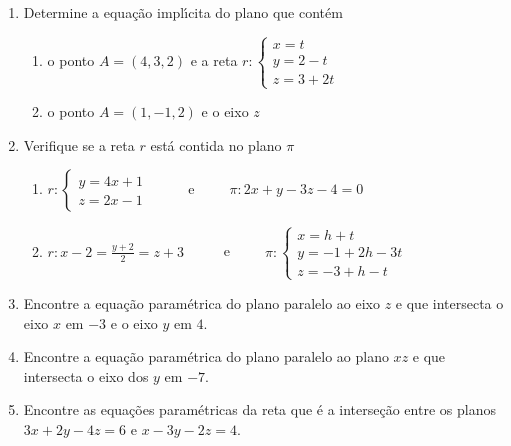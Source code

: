 \documentclass[a4paper,5pt]{amsbook}
\begin{document}
\begin{enumerate}
	\vspace{0.5cm}
	\item Determine a equa\c{c}\~ao impl\'{\i}cita do plano que cont\'em
	\begin{enumerate}
		\vspace{0.3cm}
		\item o ponto $A = (4, 3, 2)$ e a reta
			$r:\left\{\begin{array}{l}
				x = t \\
				y = 2 -t \\
				z = 3 + 2t
			\end{array}\right.$
		\vspace{0.3cm}
		\item o ponto $A = (1, -1, 2)$ e o eixo $z$
	\end{enumerate}
	
	\vspace{0.5cm}
	\item Verifique se a reta $r$ est\'a contida no plano $\pi$
	\begin{enumerate}
		\vspace{0.3cm}
		\item 
			$r:\left\{\begin{array}{l}
				y = 4x + 1 \\
				z = 2x - 1
			\end{array}\right.$
		\ \ \ \ \ e\ \ \ \ \ 
			$\pi:2x + y - 3z - 4 = 0$
		\vspace{0.3cm}
		\item
			$r: x-2 = \frac{y+2}{2} = z+3$
		\ \ \ \ \ e\ \ \ \ \ 
			$\pi:\left\{\begin{array}{l}
				x = h + t \\
				y = -1 + 2h - 3t \\
				z = -3 + h -t
			\end{array}\right.$
	\end{enumerate}
	
	\vspace{0.5cm}
	\item Encontre a equa\c{c}\~ao param\'etrica do plano paralelo ao eixo $z$ e
		que intersecta o eixo $x$ em $-3$ e o eixo $y$ em $4$.
	
	\vspace{0.5cm}
	\item Encontre a equa\c{c}\~ao param\'etrica do plano paralelo ao plano $xz$ e que
		intersecta o eixo dos $y$ em $-7$.

	\vspace{0.5cm}
	\item Encontre as equa\c{c}\~oes param\'etricas da reta que \'e a interse\c{c}\~ao entre os
		planos $3x+2y-4z=6$ e $x-3y-2z=4$.


\end{enumerate}
\end{document}
